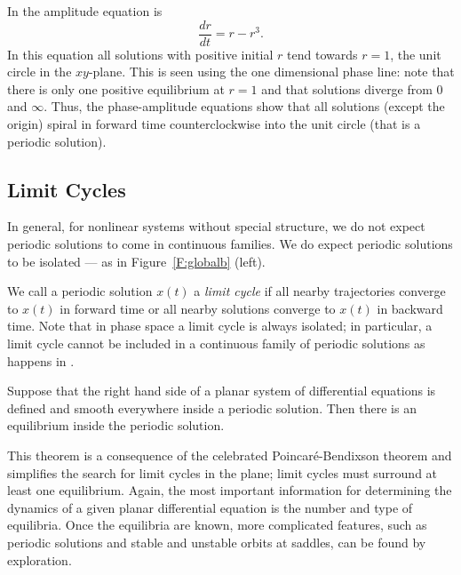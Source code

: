 \documentclass{ximera}
\begin{document}
In  the amplitude equation is 
\[
\frac{dr}{dt} = r-r^3.
\]
In this equation all solutions with positive initial $r$ tend towards 
$r=1$, the unit circle in the $xy$-plane.  This is seen using the one
dimensional phase line: note that there is only one positive equilibrium at 
$r=1$ and that solutions diverge from $0$ and $\infty$.  Thus, the 
phase-amplitude equations show that 
all solutions (except the origin) spiral in forward time counterclockwise 
into the unit circle (that is a periodic solution).

\subsection*{Limit Cycles}

In general, for nonlinear systems without special structure, 
we do not expect periodic solutions to come in continuous families.
We do expect periodic solutions to be isolated --- as in 
Figure~\ref{F:globalb} (left).  

We call a periodic solution $x(t)$ a {\em limit cycle\/} if all 
nearby trajectories converge to $x(t)$ in forward time or all nearby
solutions converge to $x(t)$ in backward time.  Note that in phase 
space a limit cycle is always isolated; in particular, a limit cycle 
cannot be included in a continuous family of periodic solutions as 
happens in .

\begin{thm} \label{T:PB}
Suppose that the right hand side of a planar system of differential 
equations is defined and smooth everywhere inside a periodic solution.  
Then there is an equilibrium inside the periodic solution.
\end{thm} 

This theorem is a consequence of the celebrated Poincar\'e-Bendixson theorem
 and simplifies the search for limit 
cycles in the plane; limit cycles must surround at least one equilibrium.  
Again, the most important information for determining the dynamics of a given 
planar differential equation is the number and type of equilibria.  Once the 
equilibria are known, more complicated features, such as periodic 
solutions and stable and unstable orbits at saddles, can be found by 
exploration.

\EXER

\TEXER
\end{document}
